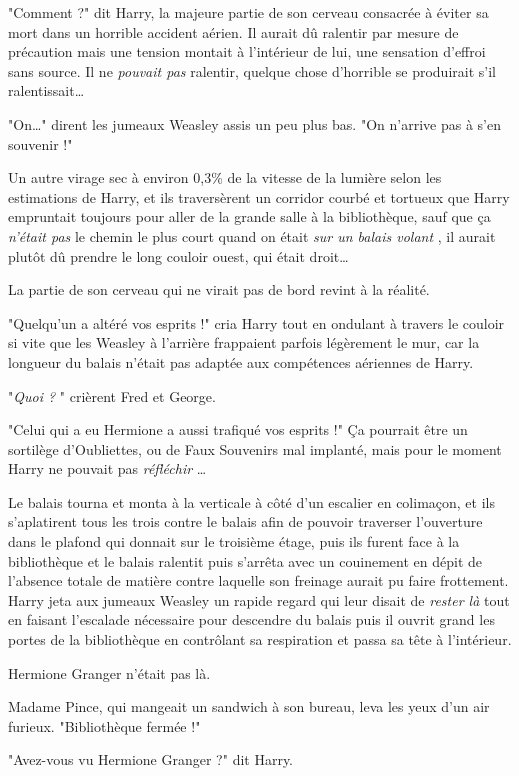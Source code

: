 "Comment ?" dit Harry, la majeure partie de son cerveau consacrée à éviter sa mort dans un horrible accident aérien. Il aurait dû ralentir par mesure de précaution mais une tension montait à l'intérieur de lui, une sensation d'effroi sans source. Il ne \emph{pouvait pas}  ralentir, quelque chose d'horrible se produirait s'il ralentissait…

"On…" dirent les jumeaux Weasley assis un peu plus bas. "On n'arrive pas à s'en souvenir !"

Un autre virage sec à environ 0,3\% de la vitesse de la lumière selon les estimations de Harry, et ils traversèrent un corridor courbé et tortueux que Harry empruntait toujours pour aller de la grande salle à la bibliothèque, sauf que ça \emph{n'était pas}  le chemin le plus court quand on était \emph{sur un balais volant} , il aurait plutôt dû prendre le long couloir ouest, qui était droit…

La partie de son cerveau qui ne virait pas de bord revint à la réalité.

"Quelqu'un a altéré vos esprits !" cria Harry tout en ondulant à travers le couloir si vite que les Weasley à l'arrière frappaient parfois légèrement le mur, car la longueur du balais n'était pas adaptée aux compétences aériennes de Harry.

"\emph{Quoi ?} " crièrent Fred et George.

"Celui qui a eu Hermione a aussi trafiqué vos esprits !" Ça pourrait être un sortilège d'Oubliettes, ou de Faux Souvenirs mal implanté, mais pour le moment Harry ne pouvait pas \emph{réfléchir} …

Le balais tourna et monta à la verticale à côté d'un escalier en colimaçon, et ils s'aplatirent tous les trois contre le balais afin de pouvoir traverser l'ouverture dans le plafond qui donnait sur le troisième étage, puis ils furent face à la bibliothèque et le balais ralentit puis s'arrêta avec un couinement en dépit de l'absence totale de matière contre laquelle son freinage aurait pu faire frottement. Harry jeta aux jumeaux Weasley un rapide regard qui leur disait de \emph{rester là}  tout en faisant l'escalade nécessaire pour descendre du balais puis il ouvrit grand les portes de la bibliothèque en contrôlant sa respiration et passa sa tête à l'intérieur.

Hermione Granger n'était pas là.

Madame Pince, qui mangeait un sandwich à son bureau, leva les yeux d'un air furieux. "Bibliothèque fermée !"

"Avez-vous vu Hermione Granger ?" dit Harry.

